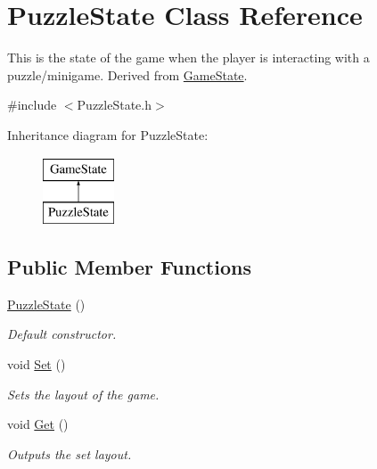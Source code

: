 \hypertarget{classPuzzleState}{\section{Puzzle\-State Class Reference}
\label{classPuzzleState}
}


This is the state of the game when the player is interacting with a puzzle/minigame. Derived from \hyperlink{classGameState}{Game\-State}.  




{\ttfamily \#include $<$Puzzle\-State.\-h$>$}

Inheritance diagram for Puzzle\-State\-:\begin{figure}[H]
\begin{center}
\leavevmode
\includegraphics[height=2.000000cm]{classPuzzleState}
\end{center}
\end{figure}
\subsection*{Public Member Functions}
\begin{DoxyCompactItemize}
\item 
\hypertarget{classPuzzleState_a441deecdaf8b7ff103933664ff476870}{\hyperlink{classPuzzleState_a441deecdaf8b7ff103933664ff476870}{Puzzle\-State} ()}\label{classPuzzleState_a441deecdaf8b7ff103933664ff476870}

\begin{DoxyCompactList}\small\item\em Default constructor. \end{DoxyCompactList}\item 
\hypertarget{classPuzzleState_a966b0f168ff5499f247c9ab519b524ab}{void \hyperlink{classPuzzleState_a966b0f168ff5499f247c9ab519b524ab}{Set} ()}\label{classPuzzleState_a966b0f168ff5499f247c9ab519b524ab}

\begin{DoxyCompactList}\small\item\em Sets the layout of the game. \end{DoxyCompactList}\item 
\hypertarget{classPuzzleState_ac9f6dd77d6471165d9eb2c18bd051dd1}{void \hyperlink{classPuzzleState_ac9f6dd77d6471165d9eb2c18bd051dd1}{Get} ()}\label{classPuzzleState_ac9f6dd77d6471165d9eb2c18bd051dd1}

\begin{DoxyCompactList}\small\item\em Outputs the set layout. \end{DoxyCompactList}\end{DoxyCompactItemize}
